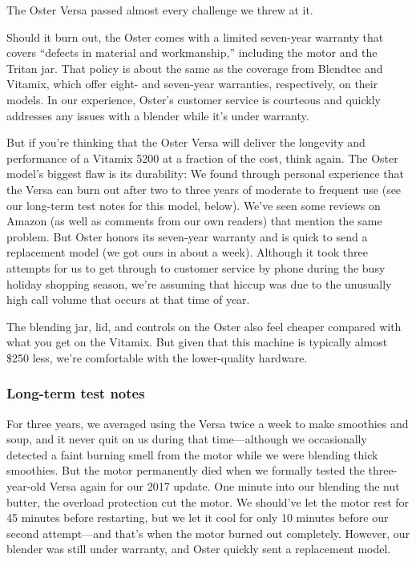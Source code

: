 The Oster Versa passed almost every challenge we threw at it.

Should it burn out, the Oster comes with a limited seven-year warranty
that covers ``defects in material and workmanship,'' including the motor
and the Tritan jar. That policy is about the same as the coverage from
Blendtec and Vitamix, which offer eight- and seven-year warranties,
respectively, on their models. In our experience, Oster's customer
service is courteous and quickly addresses any issues with a blender
while it's under warranty.

But if you're thinking that the Oster Versa will deliver the longevity
and performance of a Vitamix 5200 at a fraction of the cost, think
again. The Oster model's biggest flaw is its durability: We found
through personal experience that the Versa can burn out after two to
three years of moderate to frequent use (see our long-term test notes
for this model, below). We've seen some reviews on Amazon (as well as
comments from our own readers) that mention the same problem. But Oster
honors its seven-year warranty and is quick to send a replacement model
(we got ours in about a week). Although it took three attempts for us to
get through to customer service by phone during the busy holiday
shopping season, we're assuming that hiccup was due to the unusually
high call volume that occurs at that time of year.

The blending jar, lid, and controls on the Oster also feel cheaper
compared with what you get on the Vitamix. But given that this machine
is typically almost \$250 less, we're comfortable with the lower-quality
hardware.

\hypertarget{long-term-test-notes-1}{%
\subsubsection{Long-term test notes}\label{long-term-test-notes-1}}

For three years, we averaged using the Versa twice a week to make
smoothies and soup, and it never quit on us during that time---although
we occasionally detected a faint burning smell from the motor while we
were blending thick smoothies. But the motor permanently died when we
formally tested the three-year-old Versa again for our 2017 update. One
minute into our blending the nut butter, the overload protection cut the
motor. We should've let the motor rest for 45 minutes before restarting,
but we let it cool for only 10 minutes before our second attempt---and
that's when the motor burned out completely. However, our blender was
still under warranty, and Oster quickly sent a replacement model.

